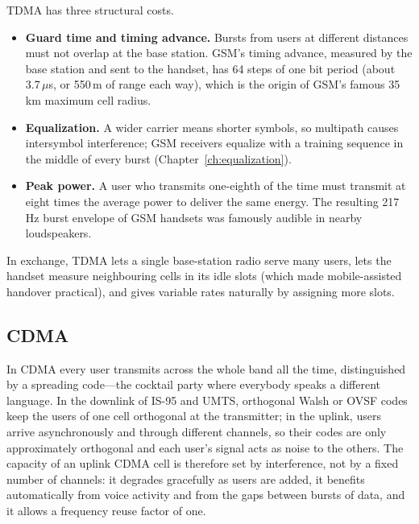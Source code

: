 
TDMA has three structural costs.
\begin{itemize}
\item \textbf{Guard time and timing advance.} Bursts from users at different distances must not
overlap at the base station. GSM's timing advance, measured by the base station and sent to the
handset, has 64 steps of one bit period (about 3.7\,$\mu$s, or 550\,m of range each way), which is
the origin of GSM's famous 35\,km maximum cell radius.
\item \textbf{Equalization.} A wider carrier means shorter symbols, so multipath causes intersymbol
interference; GSM receivers equalize with a training sequence in the middle of every burst
(Chapter~\ref{ch:equalization}).
\item \textbf{Peak power.} A user who transmits one-eighth of the time must transmit at eight times
the average power to deliver the same energy. The resulting 217\,Hz burst envelope of GSM handsets
was famously audible in nearby loudspeakers.
\end{itemize}
In exchange, TDMA lets a single base-station radio serve many users, lets the handset measure
neighbouring cells in its idle slots (which made mobile-assisted handover practical), and gives
variable rates naturally by assigning more slots.

\subsection{CDMA}

In CDMA every user transmits across the whole band all the time, distinguished by a spreading
code---the cocktail party where everybody speaks a different language. In the downlink of IS-95 and
UMTS, orthogonal Walsh or OVSF codes keep the users of one cell orthogonal at the transmitter; in the
uplink, users arrive asynchronously and through different channels, so their codes are only
approximately orthogonal and each user's signal acts as noise to the others. The capacity of an
uplink CDMA cell is therefore set by interference, not by a fixed number of channels: it degrades
gracefully as users are added, it benefits automatically from voice activity and from the gaps between
bursts of data, and it allows a frequency reuse factor of one.

